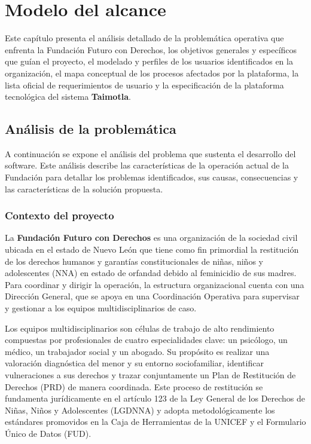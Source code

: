 \chapter{Modelo del alcance}
\label{cap:reqUsr}

Este capítulo presenta el análisis detallado de la problemática operativa que enfrenta la Fundación Futuro con Derechos, los objetivos generales y específicos que guían el proyecto, el modelado y perfiles de los usuarios identificados en la organización, el mapa conceptual de los procesos afectados por la plataforma, la lista oficial de requerimientos de usuario y la especificación de la plataforma tecnológica del sistema \textbf{Taimotla}.

\section{Análisis de la problemática}

A continuación se expone el análisis del problema que sustenta el desarrollo del software. Este análisis describe las características de la operación actual de la Fundación para detallar los problemas identificados, sus causas, consecuencias y las características de la solución propuesta.

\subsection{Contexto del proyecto}

La \textbf{Fundación Futuro con Derechos} es una organización de la sociedad civil ubicada en el estado de Nuevo León que tiene como fin primordial la restitución de los derechos humanos y garantías constitucionales de niñas, niños y adolescentes (NNA) en estado de orfandad debido al feminicidio de sus madres. Para coordinar y dirigir la operación, la estructura organizacional cuenta con una Dirección General, que se apoya en una Coordinación Operativa para supervisar y gestionar a los equipos multidisciplinarios de caso.

Los equipos multidisciplinarios son células de trabajo de alto rendimiento compuestas por profesionales de cuatro especialidades clave: un psicólogo, un médico, un trabajador social y un abogado. Su propósito es realizar una valoración diagnóstica del menor y su entorno sociofamiliar, identificar vulneraciones a sus derechos y trazar conjuntamente un Plan de Restitución de Derechos (PRD) de manera coordinada. Este proceso de restitución se fundamenta jurídicamente en el artículo 123 de la Ley General de los Derechos de Niñas, Niños y Adolescentes (LGDNNA) y adopta metodológicamente los estándares promovidos en la Caja de Herramientas de la UNICEF y el Formulario Único de Datos (FUD).

